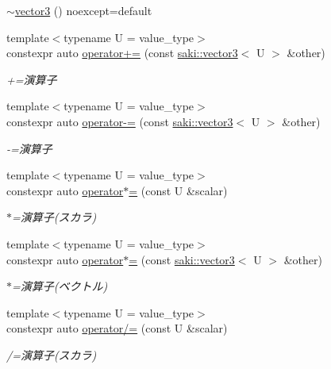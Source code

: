 \begin{DoxyCompactItemize}
\item 
\mbox{\hyperlink{classsaki_1_1vector3_af166a2df5fc3309b2fdf777a88ee4b67}{$\sim$vector3}} () noexcept=default
\item 
{\footnotesize template$<$typename U  = value\+\_\+type$>$ }\\constexpr auto \mbox{\hyperlink{classsaki_1_1vector3_a43154ea2ea8a46b43e1bd7d6afe9dd09}{operator+=}} (const \mbox{\hyperlink{classsaki_1_1vector3}{saki\+::vector3}}$<$ U $>$ \&other)
\begin{DoxyCompactList}\small\item\em +=演算子 \end{DoxyCompactList}\item 
{\footnotesize template$<$typename U  = value\+\_\+type$>$ }\\constexpr auto \mbox{\hyperlink{classsaki_1_1vector3_ad52d6e5aff4f4c1575f9f4ee07730eff}{operator-\/=}} (const \mbox{\hyperlink{classsaki_1_1vector3}{saki\+::vector3}}$<$ U $>$ \&other)
\begin{DoxyCompactList}\small\item\em -\/=演算子 \end{DoxyCompactList}\item 
{\footnotesize template$<$typename U  = value\+\_\+type$>$ }\\constexpr auto \mbox{\hyperlink{classsaki_1_1vector3_a4318c169c217b1b35b3d79ee53d767f5}{operator$\ast$=}} (const U \&scalar)
\begin{DoxyCompactList}\small\item\em $\ast$=演算子(スカラ) \end{DoxyCompactList}\item 
{\footnotesize template$<$typename U  = value\+\_\+type$>$ }\\constexpr auto \mbox{\hyperlink{classsaki_1_1vector3_acb87d334559aa5e1da12e680193eba84}{operator$\ast$=}} (const \mbox{\hyperlink{classsaki_1_1vector3}{saki\+::vector3}}$<$ U $>$ \&other)
\begin{DoxyCompactList}\small\item\em $\ast$=演算子(ベクトル) \end{DoxyCompactList}\item 
{\footnotesize template$<$typename U  = value\+\_\+type$>$ }\\constexpr auto \mbox{\hyperlink{classsaki_1_1vector3_aada96ea6099dc050f89bc0fead1706ca}{operator/=}} (const U \&scalar)
\begin{DoxyCompactList}\small\item\em /=演算子(スカラ) \end{DoxyCompactList}\item 

\end{DoxyCompactItemize}

